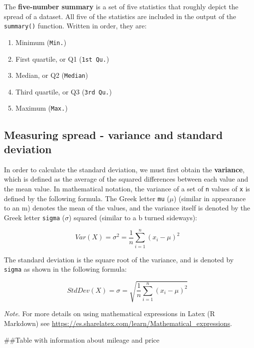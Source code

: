 \documentclass[
]{article}
\newenvironment{Shaded}{\begin{snugshade}}{\end{snugshade}}
\newcommand{\FunctionTok}[1]{\textcolor[rgb]{0.00,0.00,0.00}{#1}}
\newcommand{\NormalTok}[1]{#1}
\newcommand{\OtherTok}[1]{\textcolor[rgb]{0.56,0.35,0.01}{#1}}
\newcommand{\SpecialCharTok}[1]{\textcolor[rgb]{0.00,0.00,0.00}{#1}}
\providecommand{\tightlist}{%
  \setlength{\itemsep}{0pt}\setlength{\parskip}{0pt}}
\begin{document}
The \textbf{five-number summary} is a set of five statistics that
roughly depict the spread of a dataset. All five of the statistics are
included in the output of the \texttt{summary()} function. Written in
order, they are:

\begin{enumerate}
\def\labelenumi{\arabic{enumi}.}
\tightlist
\item
  Minimum (\texttt{Min.})
\item
  First quartile, or Q1 (\texttt{1st\ Qu.})
\item
  Median, or Q2 (\texttt{Median})
\item
  Third quartile, or Q3 (\texttt{3rd\ Qu.})
\item
  Maximum (\texttt{Max.})
\end{enumerate}

\hypertarget{measuring-spread---variance-and-standard-deviation}{%
\subsection{Measuring spread - variance and standard
deviation}\label{measuring-spread---variance-and-standard-deviation}}

In order to calculate the standard deviation, we must first obtain the
\textbf{variance}, which is defined as the average of the squared
differences between each value and the mean value. In mathematical
notation, the variance of a set of \texttt{n} values of \texttt{x} is
defined by the following formula. The Greek letter \texttt{mu} (\(\mu\))
(similar in appearance to an m) denotes the mean of the values, and the
variance itself is denoted by the Greek letter \texttt{sigma}
(\(\sigma\)) squared (similar to a b turned sideways):

\[
Var(X)= \sigma^2 = \frac{1}{n}\sum_{i=1}^n (x_i - \mu)^2
\]

The standard deviation is the square root of the variance, and is
denoted by \texttt{sigma} as shown in the following formula:

\[
StdDev(X)= \sigma = \sqrt{\frac{1}{n}\sum_{i=1}^n (x_i - \mu)^2}
\]

\emph{Note}. For more details on using mathematical expressions in Latex
(R Markdown) see
\url{https://es.sharelatex.com/learn/Mathematical_expressions}.

\#\#Table with information about mileage and price

\begin{Shaded}
\end{Shaded}
\end{document}
